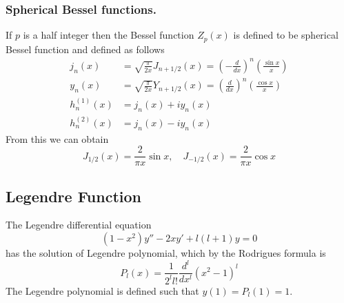 \documentclass[../../../main.tex]{subfiles}
\begin{document}
\subsubsection{Spherical Bessel functions.} If $p$ is a half integer
then the Bessel function $Z_p(x)$ is defined to be spherical Bessel function and defined as follows
\begin{align*}
    j_n(x)       & =\sqrt{\frac{\pi}{2x}}J_{n+1/2}(x)=\left(-\frac{d}{dx}\right)^n\left(\frac{\sin x}{x}\right) \\
    y_n(x)       & =\sqrt{\frac{\pi}{2x}}Y_{n+1/2}(x)=\left(\frac{d}{dx}\right)^n\left(\frac{\cos x}{x}\right)  \\
    h_n^{(1)}(x) & =j_n(x)+iy_n(x)                                                                              \\
    h_n^{(2)}(x) & =j_n(x)-iy_n(x)
\end{align*}
From this we can obtain
\begin{equation*}
    J_{1/2}(x)=\frac{2}{\pi x}\sin x, \quad J_{-1/2}(x)=\frac{2}{\pi x}\cos x
\end{equation*}

\subsection{Legendre Function}
The Legendre differential equation
\begin{equation*}
    (1-x^2)y''-2xy'+l(l+1)y=0
\end{equation*}
has the solution of Legendre polynomial, which by the Rodrigues formula is
\begin{equation*}
    P_l(x)=\frac{1}{2^ll!}\frac{d^l}{dx^l}(x^2-1)^l
\end{equation*}
The Legendre polynomial is defined such that $y(1)=P_l(1)=1$.
\end{document}
